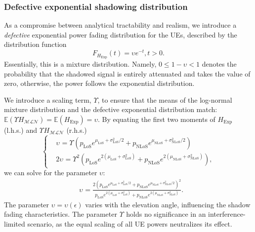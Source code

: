 \documentclass[lettersize,journal]{IEEEtran}
\begin{document}
\subsubsection{Defective exponential shadowing distribution}
As a compromise between analytical tractability and realism, we introduce a \textit{defective} exponential power fading distribution for the UEs, described by the distribution function
\begin{equation}
  \label{eq:defexp}
  F_{{H}_{\text{Exp}}}(t) = \upsilon e^{-t}, t>0.
\end{equation}
Essentially, this is a mixture distribution. Namely, $0 \leq 1-\upsilon < 1$ denotes the probability that the shadowed signal is entirely attenuated and takes the value of zero, otherwise, the power follows the exponential distribution. 

 We introduce a scaling term, $\Upsilon$, to ensure that the means of the log-normal mixture distribution and the defective exponential distribution match: $\mathbb{E}(\Upsilon H_{\mathcal{MLN}}) = \mathbb{E}(H_{\text{Exp}}) = \upsilon$. By equating the first two moments of $H_{\text{Exp}}$ (l.h.s.) and $\Upsilon_{} H_{\mathcal{M} \mathcal{L}\mathcal{N}}$ (r.h.s.)
\begin{equation}
  \label{eq:matchingmoments}
  \begin{cases}
    &\upsilon_{} = \Upsilon_{} \left(p_{\text{LoS}} e^{\mu_{\text{LoS}} + \sigma_{\text{LoS}}^2/2} + p_{\text{NLoS}} e^{\mu_{\text{NLoS}} + \sigma_{\text{NLoS}}^2/2}\right)\\
    &2\upsilon_{}= \Upsilon_{}^2 \left( p_{\text{LoS}} e^{2(\mu_{\text{LoS}} + \sigma_{\text{LoS}}^2)} + p_{\text{NLoS}} e^{2(\mu_{\text{NLoS}} + \sigma_{\text{NLoS}}^2)} \right), 
  \end{cases}
\end{equation}
 we can solve for the parameter $\upsilon$:
\begin{align}
  \label{eq:upsilon}
  & \upsilon_{}=\frac{ 2\left( p_{\text{LoS}}e^{\mu_{\text{LoS}}+\sigma^2_{\text{LoS}}/2}+p_{\text{NLoS}}e^{\mu_{\text{NLoS}}+\sigma^2_{\text{NLoS}}/2} \right)^2}{p_{\text{LoS}}e^{2(\mu_{\text{LoS}}+\sigma_{\text{LoS}}^2)}+p_{\text{NLoS}}e^{2(\mu_{\text{NLoS}}+\sigma_{\text{NLoS}}^2)}}.
\end{align}
The parameter $\upsilon=\upsilon(\epsilon)$ varies with the elevation angle, influencing the shadow fading characteristics. The parameter $\Upsilon_{}$ holds no significance in an interference-limited scenario, as the equal scaling of all UE powers neutralizes its effect.
\end{document}
